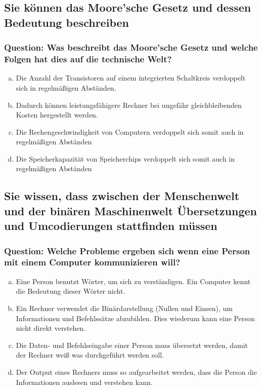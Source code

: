 \documentclass{article}
\begin{document}
\begin{adjustwidth}{2em}{2em}
\begin{adjustwidth}{2em}{2em}
			\subsection{Sie können das Moore'sche Gesetz und dessen Bedeutung beschreiben}
			\begin{adjustwidth}{1em}{}
				\subsubsection*{Question: Was beschreibt das Moore'sche Gesetz und welche Folgen hat dies auf die technische Welt?}
				\begin{adjustwidth}{1em}{}
					\begin{enumerate}[(a)]
						\item Die Anzahl der Transistoren auf einem integrierten Schaltkreis verdoppelt sich in regelmäßigen Abständen.
						\item Dadurch können leistungsfähigere Rechner bei ungefähr gleichbleibenden Kosten hergestellt werden.
						\item Die Rechengeschwindigkeit von Computern verdoppelt sich somit auch in regelmäßigen Abständen
						\item Die Speicherkapazität von Speicherchips verdoppelt sich somit auch in regelmäßigen Abständen
					\end{enumerate}
				\end{adjustwidth}
			\end{adjustwidth}
			\subsection{Sie wissen, dass zwischen der Menschenwelt und der binären Maschinenwelt Übersetzungen und Umcodierungen stattfinden müssen}
			\begin{adjustwidth}{1em}{}
				\subsubsection*{Question: Welche Probleme ergeben sich wenn eine Person mit einem Computer kommunizieren will?}
				\begin{adjustwidth}{1em}{}
					\begin{enumerate}[(a)]
						\item Eine Person benutzt Wörter, um sich zu verständigen. Ein Computer kennt die Bedeutung dieser Wörter nicht.
						\item Ein Rechner verwendet die Binärdarstellung (Nullen und Einsen), um Informationen und Befehlssätze abzubilden. Dies wiederum kann eine Person nicht direkt verstehen.
						\item Die Daten- und Befehlseingabe einer Person muss übersetzt werden, damit der Rechner weiß was durchgeführt werden soll.
						\item Der Output eines Rechners muss so aufgearbeitet werden, dass die Person die Informationen auslesen und verstehen kann.
					\end{enumerate}
				\end{adjustwidth}
			\end{adjustwidth}

\end{adjustwidth}
\end{adjustwidth}
\end{document}
